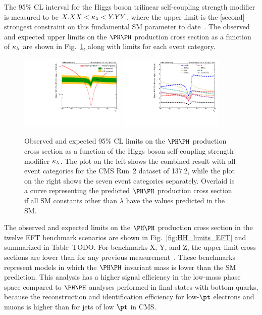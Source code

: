 The 95\% CL interval for the Higgs boson trilinear self-coupling strength modifier
is measured to be $X.XX < \kappa_{\lambda} < Y.YY$, where the upper limit is the [second]
strongest constraint on this fundamental SM parameter to date~\cite{Sirunyan:2745738,Sirunyan:2018ayu,2020135103}.
The observed and expected upper limits on the $\HH$ production cross section as a function of
$\kappa_{\lambda}$ are shown in Fig.~\ref{fig:HH_limits_kLambda}, along with limits for each event category.

\begin{figure}
  \centering
  \includegraphics[width=0.45\textwidth]{figures/klscan.pdf}
  \hspace{0.05\textwidth}
  \includegraphics[width=0.45\textwidth]{figures/klMultiscan.pdf}
  \caption{
    Observed and expected 95\% CL limits on the $\HH$ production cross section as
    a function of the Higgs boson self-coupling strength modifier $\kappa_{\lambda}$.
    The plot on the left shows the combined result with all event categories for
    the CMS Run~2 dataset of 137.2\fbinv, while the plot on the right shows the
    seven event categories separately.  Overlaid is a curve representing the
    predicted $\HH$ production cross section if all SM constants other than
    $\lambda$ have the values predicted in the SM.
  }
  \label{fig:HH_limits_kLambda}
\end{figure}

The observed and expected limits on the $\HH$ production cross section in the
twelve EFT benchmark scenarios are shown in Fig.~\ref{fig:HH_limits_EFT}
and summarized in Table~TODO.
For benchmarks X, Y, and Z, the upper limit cross sections are lower
than for any previous measurement~\cite{Sirunyan:2745738}.
These benchmarks represent models in which the $\HH$ invariant mass is
lower than the SM prediction.  This analysis has a higher signal efficiency
in the low-mass phase space compared to $\HH$ analyses performed in final states with bottom quarks,
because the reconstruction and identification efficiency for low-$\pt$ electrons and muons is higher than for jets of low $\pt$ in CMS.

